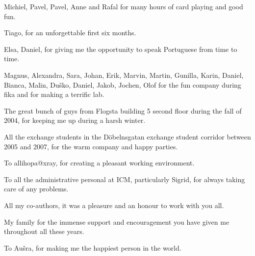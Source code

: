 \noindent
Michiel, Pavel, Pavel, Anne and Rafal for many hours of card playing and good fun.
\vspace{0.5cm}

\noindent
Tiago, for an unforgettable first six months.
\vspace{0.5cm}

\noindent
Elsa, Daniel, for giving me the opportunity to speak Portuguese from time
to time.
\vspace{0.5cm}

\noindent
Magnus, Alexandra, Sara, Johan, Erik, Marvin, Martin, Gunilla, Karin,
Daniel, Bianca, Malin, Du\v{s}ko, Daniel, Jakob, Jochen, Olof for the fun company during
fika and for making a terrific lab.
\vspace{0.5cm}

\noindent 
The great bunch of guys from Flogsta building 5 second floor during the fall of
2004, for keeping me up during a harsh winter.
\vspace{0.5cm}
 
\noindent
All the exchange students in the D\"obelnsgatan exchange student corridor between 
2005 and 2007, for the warm company and happy parties.
\vspace{0.5cm}
 
\noindent
To allihopa@xray, for creating a pleasant working environment.
\vspace{0.5cm}

\noindent
To all the administrative personal at ICM, particularly Sigrid, for always
taking care of any problems.
\vspace{0.5cm}

\noindent
All my co-authors, it was a pleasure and an honour to work with you all.
\vspace{0.5cm}

\noindent
My family for the immense support and encouragement you have given me
throughout all these years.
\vspace{0.5cm}

\noindent
To Au\v{s}ra, for making me the happiest person in the world.
